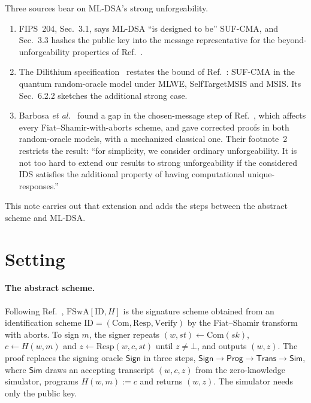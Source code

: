 \documentclass[aps,prx,reprint,superscriptaddress,nofootinbib,floatfix]{revtex4-2}
\theoremstyle{remark}
\newcommand{\Sign}{\textsf{Sign}}
\newcommand{\Sim}{\textsf{Sim}}
\begin{document}
Three sources bear on ML-DSA's strong unforgeability.
\begin{enumerate}
\item FIPS~204, Sec.~3.1, says ML-DSA ``is designed to be'' SUF-CMA, and Sec.~3.3 hashes the public key into the message representative for the beyond-unforgeability properties of Ref.~\cite{buff}.
\item The Dilithium specification~\cite[Sec.~6.2]{dilithium} restates the bound of Ref.~\cite{kls18}: SUF-CMA in the quantum random-oracle model under MLWE, SelfTargetMSIS and MSIS. Its Sec.~6.2.2 sketches the additional strong case.
\item Barbosa \emph{et al.}~\cite{fsa-fix} found a gap in the chosen-message step of Ref.~\cite{kls18}, which affects every Fiat--Shamir-with-aborts scheme, and gave corrected proofs in both random-oracle models, with a mechanized classical one. Their footnote~2 restricts the result: ``for simplicity, we consider ordinary unforgeability. It is not too hard to extend our results to strong unforgeability if the considered IDS satisfies the additional property of having computational unique-responses.''
\end{enumerate}
This note carries out that extension and adds the steps between the abstract scheme and ML-DSA.

\section{Setting}

\paragraph*{The abstract scheme.} Following Ref.~\cite{fsa-fix}, $\mathrm{FSwA}[\mathrm{ID},H]$ is the signature scheme obtained from an identification scheme $\mathrm{ID}=(\mathrm{Com},\mathrm{Resp},\mathrm{Verify})$ by the Fiat--Shamir transform with aborts. To sign $m$, the signer repeats $(w,\mathit{st})\gets\mathrm{Com}(\mathit{sk})$, $c\gets H(w,m)$ and $z\gets\mathrm{Resp}(w,c,\mathit{st})$ until $z\neq\bot$, and outputs $(w,z)$. The proof replaces the signing oracle $\Sign$ in three steps, $\Sign\to\textsf{Prog}\to\textsf{Trans}\to\Sim$, where $\Sim$ draws an accepting transcript $(w,c,z)$ from the zero-knowledge simulator, programs $H(w,m):=c$ and returns $(w,z)$. The simulator needs only the public key.
\end{document}
